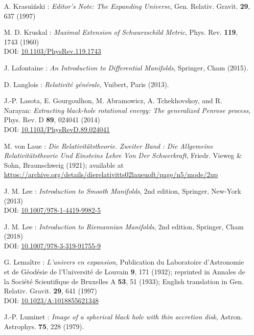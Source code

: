 \begin{thebibliography}{123}
A. Krasui\'nski :
{\em Editor's Note: The Expanding Universe},
Gen. Relativ. Gravit. {\bf 29}, 637 (1997)

M. D. Kruskal :
{\em Maximal Extension of Schwarzschild Metric},
Phys. Rev. {\bf 119}, 1743 (1960)\\
DOI: \href{https://doi.org/10.1103/PhysRev.119.1743}{10.1103/PhysRev.119.1743}

J. Lafontaine : {\em An Introduction to Differential Manifolds},
Springer, Cham (2015).

D. Langlois : \emph{Relativit\'e g\'en\'erale},
Vuibert, Paris (2013).

J.-P. Lasota, E. Gourgoulhon, M. Abramowicz, A. Tchekhovskoy,
and R. Narayan:
{\em Extracting black-hole rotational energy: The generalized Penrose process},
Phys. Rev. D {\bf 89}, 024041 (2014)  \\
DOI: \href{https://doi.org/10.1103/PhysRevD.89.024041}{10.1103/PhysRevD.89.024041}

M. von Laue : {\em Die Relativitätstheorie. Zweiter Band : Die Allgemeine Relativitätstheorie Und Einsteins Lehre Von Der Schwerkraft},
Friedr. Vieweg \& Sohn, Braunschweig (1921); available at \\
\url{https://archive.org/details/dierelativitts02laueuoft/page/n5/mode/2up}

J. M. Lee : {\em Introduction to Smooth Manifolds}, 2nd edition,
Springer, New-York (2013)\\
DOI: \href{https://doi.org/10.1007/978-1-4419-9982-5}{10.1007/978-1-4419-9982-5}

J. M. Lee : {\em Introduction to Riemannian Manifolds}, 2nd edition,
Springer, Cham (2018)\\
DOI: \href{https://doi.org/10.1007/978-3-319-91755-9}{10.1007/978-3-319-91755-9}

G. Lemaître : {\em L'univers en expansion},
Publication du Laboratoire d'Astronomie et de Géodésie de l'Université
de Louvain {\bf 9},  171 (1932); reprinted in
Annales de la Société Scientifique de Bruxelles A {\bf 53}, 51 (1933);
English translation in
Gen. Relativ. Gravit. {\bf 29}, 641 (1997)\\
DOI: \href{https://doi.org/10.1023/A:1018855621348}{10.1023/A:1018855621348}

J.-P. Luminet : {\em Image of a spherical black hole with thin accretion disk},
Astron. Astrophys. {\bf 75}, 228 (1979).


\end{thebibliography}
